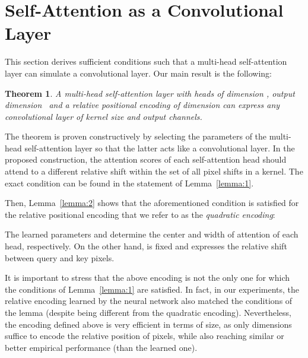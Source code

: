 \documentclass{article} \usepackage{iclr2020_conference,times}
\newtheorem{theorem}{Theorem}
\begin{document}
\section{Self-Attention as a Convolutional Layer}
\label{sec:attention_can_implement_cnn}

This section derives sufficient conditions such that a multi-head self-attention layer can simulate a convolutional layer.
Our main result is the following:


\begin{theorem}
  A multi-head self-attention layer with  heads of dimension , output dimension~ and a relative positional encoding of dimension 
  can express any convolutional layer of kernel size 
  and  output channels.
  \label{thm:the_theorem}
\end{theorem}


The theorem is proven constructively by selecting the parameters of the multi-head self-attention layer so that the latter acts like a convolutional layer.
In the proposed construction, the attention scores of each self-attention head should attend to a different relative shift within the set  of all pixel shifts in a  kernel. The exact condition can be found in the statement of Lemma~\ref{lemma:1}.

Then, Lemma~\ref{lemma:2} shows that the aforementioned condition is satisfied for the relative positional encoding that we refer to as the \textit{quadratic encoding}:

The learned parameters  and  determine the center and width of attention of each head, respectively. On the other hand,  is fixed and expresses the relative shift between query and key pixels.

It is important to stress that the above encoding is not the only one for which the
conditions of Lemma~\ref{lemma:1} are satisfied. In fact, in our experiments, the relative encoding learned by the neural network also matched the conditions of the lemma (despite being different from the quadratic encoding). Nevertheless, the encoding defined above is very efficient in terms of size, as only  dimensions suffice to encode the relative position of pixels, while also reaching similar or better empirical performance (than the learned one).
\end{document}
